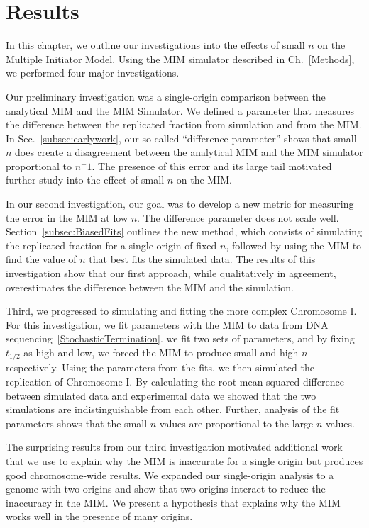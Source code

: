 \chapter{Results}
\label{ch:Results}

In this chapter, we outline our investigations into the effects of small $n$ on the Multiple Initiator Model.
Using the MIM simulator described in Ch.~\ref{Methods}, we performed four major investigations.

Our preliminary investigation was a single-origin comparison between the analytical MIM and the MIM Simulator.
We defined a parameter that measures the difference between the replicated fraction from simulation and from the MIM.
In Sec.~\ref{subsec:earlywork}, our so-called ``difference parameter'' shows that small $n$ does create a disagreement between the analytical MIM and the MIM simulator proportional to $n^-1$.
The presence of this error and its large tail motivated further study into the effect of small $n$ on the MIM.

In our second investigation, our goal was to develop a new metric for measuring the error in the MIM at low $n$.
The difference parameter does not scale well.
Section~\ref{subsec:BiasedFits} outlines the new method, which consists of simulating the replicated fraction for a single origin of fixed $n$, followed by using the MIM to find the value of $n$ that best fits the simulated data.
The results of this investigation show that our first approach, while qualitatively in agreement, overestimates the difference between the MIM and the simulation.

Third, we progressed to simulating and fitting the more complex Chromosome I.
For this investigation, we fit parameters with the MIM to data from DNA sequencing~\ref{StochasticTermination}.
we fit two sets of parameters, and by fixing $t_{1/2}$ as high and low, we forced the MIM to produce small and high $n$ respectively.
Using the parameters from the fits, we then simulated the replication of Chromosome I.
By calculating the root-mean-squared difference between simulated data and experimental data we showed that the two simulations are indistinguishable from each other.
Further, analysis of the fit parameters shows that the small-$n$ values are proportional to the large-$n$ values.

The surprising results from our third investigation motivated additional work that we use to explain why the MIM is inaccurate for a single origin but produces good chromosome-wide results.
We expanded our single-origin analysis to a genome with two origins and show that two origins interact to reduce the inaccuracy in the MIM.
We present a hypothesis that explains why the MIM works well in the presence of many origins.

